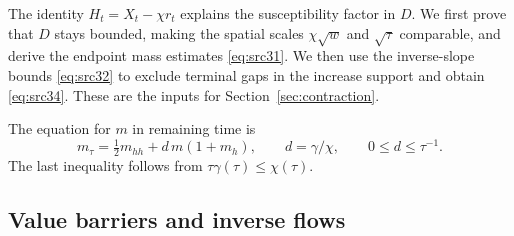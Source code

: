 \documentclass[11pt,a4paper]{article}
\numberwithin{equation}{section}
\theoremstyle{definition}
\theoremstyle{remark}
\begin{document}
The identity $H_t=X_t-\chi r_t$ explains the susceptibility factor
in $D$. We first prove that $D$ stays bounded, making the spatial
scales $\chi\sqrt w$ and $\sqrt\tau$ comparable, and derive the
endpoint mass estimates \eqref{eq:src31}. We then use the
inverse-slope bounds \eqref{eq:src32} to exclude terminal gaps in
the increase support and obtain \eqref{eq:src34}. These are the
inputs for Section~\ref{sec:contraction}.

The equation for $m$ in remaining time is
\begin{equation}\label{eq:scale-m-pde}
 m_\tau=\tfrac12m_{hh}+d\,m(1+m_h),
 \qquad d=\gamma/\chi,\qquad 0\le d\le\tau^{-1}.
\end{equation}
The last inequality follows from $\tau\gamma(\tau)\le\chi(\tau)$.

\subsection{Value barriers and inverse flows}
\end{document}
